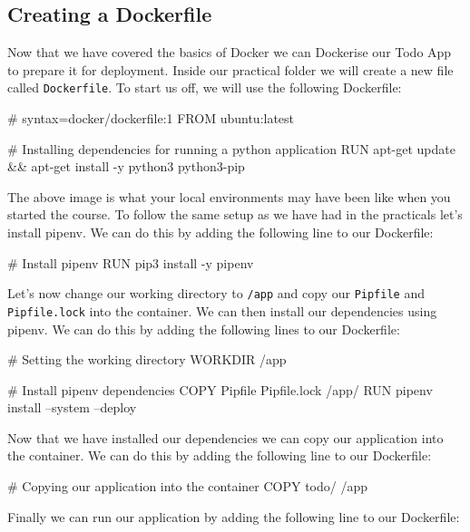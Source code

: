 \documentclass{csse4400}
\begin{document}
\subsection{Creating a Dockerfile}

Now that we have covered the basics of Docker we can Dockerise our Todo App to prepare it for deployment. Inside our practical folder we will create a new file called \texttt{Dockerfile}. To start us off, we will use the following Dockerfile:

\begin{code}[language=docker,numbers=none]{}
  # syntax=docker/dockerfile:1
  FROM ubuntu:latest

  # Installing dependencies for running a python application
  RUN apt-get update && apt-get install -y python3 python3-pip
\end{code}

The above image is what your local environments may have been like when you started the course. To follow the same setup as we have had in the practicals let's install pipenv. We can do this by adding the following line to our Dockerfile:

\begin{code}[language=docker,numbers=none]{}
  # Install pipenv
  RUN pip3 install -y pipenv
\end{code}

Let's now change our working directory to \texttt{/app} and copy our \texttt{Pipfile} and \texttt{Pipfile.lock} into the container. We can then install our dependencies using pipenv. We can do this by adding the following lines to our Dockerfile:

\begin{code}[language=docker,numbers=none]{}
  # Setting the working directory
  WORKDIR /app

  # Install pipenv dependencies
  COPY Pipfile Pipfile.lock /app/
  RUN pipenv install --system --deploy
\end{code}

Now that we have installed our dependencies we can copy our application into the container. We can do this by adding the following line to our Dockerfile:

\begin{code}[language=docker,numbers=none]{}
  # Copying our application into the container
  COPY todo/ /app

\end{code}

Finally we can run our application by adding the following line to our Dockerfile:
\end{document}
